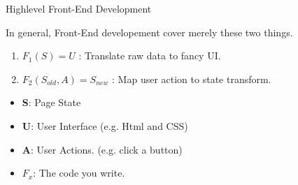 \begin{frame}{Highlevel Front-End Development}

    In general, Front-End developement  cover merely these two things.

    \begin{enumerate}
        \item  $ F_1(S) = U $ : Translate raw data to fancy UI.
        \item  $ F_2(S_{old},A)=S_{new} $ : Map user action to state transform.
    \end{enumerate}

    \begin{itemize}
        \pause
        \item \textbf{S}: Page State 
        \pause
        \item \textbf{U}: User Interface (e.g. Html and CSS)
        \pause
        \item \textbf{A}: User Actions. (e.g. click a button)
        \pause
        \item \textbf{$F_x$}: The code you write.
    \end{itemize}

    \pause


    

    
\end{frame}

